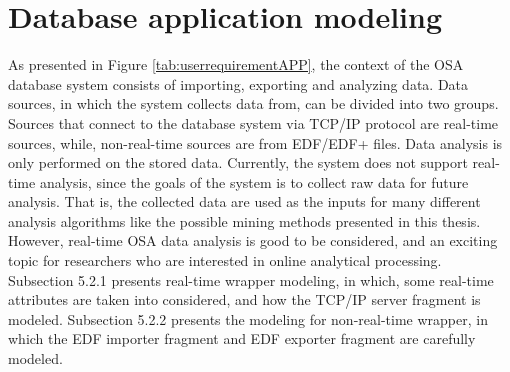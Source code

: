 \section{Database application modeling}
As presented in Figure \ref{tab:userrequirementAPP}, the context of the OSA database system consists of importing, exporting and analyzing data. Data sources, in which the system collects data from, can be divided into two groups. Sources that connect to the database system via TCP/IP protocol are real-time sources, while, non-real-time sources are from EDF/EDF+ files. Data analysis is only performed on the stored data. Currently, the system does not support real-time analysis, since the goals of the system is to collect raw data for future analysis. That is, the collected data are used as the inputs for many different analysis algorithms like the possible mining methods presented in this thesis. However, real-time OSA data analysis is good to be considered, and an exciting topic for researchers who are interested in online analytical processing.\\
Subsection 5.2.1 presents real-time wrapper modeling, in which, some real-time attributes are taken into considered, and how the TCP/IP server fragment is modeled. Subsection 5.2.2 presents the modeling for non-real-time wrapper, in which the EDF importer fragment and EDF exporter fragment are carefully modeled.
